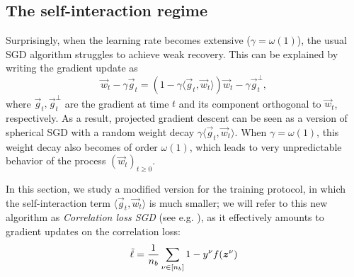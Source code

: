 \subsection{The self-interaction regime}
Surprisingly, when the learning rate becomes extensive ($\gamma = \omega(1)$), the usual SGD algorithm struggles to achieve weak recovery. This can be explained by writing the gradient update as
\[ \vec{w}_t - \gamma \vec{g}_t = (1 - \gamma\langle \vec{g}_t, \vec{w}_t \rangle)\vec{w}_t - \gamma\vec{g}_t^\bot, \]
where $\vec{g}_t, \vec{g}_t^\bot$ are the gradient at time $t$ and its component orthogonal to $\vec{w}_t$, respectively. As a result, projected gradient descent can be seen as a version of spherical SGD with a random weight decay $\gamma \langle \vec{g}_t, \vec{w}_t \rangle$. When $\gamma = \omega(1)$, this weight decay also becomes of order $\omega(1)$, which leads to very unpredictable behavior of the process $(\vec{w}_t)_{t \geq 0}$.

 In this section, we study a modified version for the training protocol, in which the self-interaction term $\langle \vec{g}_t, \vec{w}_t \rangle$ is much smaller; we will refer to this new algorithm as \emph{Correlation loss SGD} (see e.g. \cite{damian2023smoothing}), as it effectively amounts to gradient updates on the correlation loss:
\begin{align} \label{2406:eq:main:correlation_loss}
\Tilde{\ell} = \frac{1}{n_b}\sum_{\nu \in [n_b]} 1-y^{\nu}f(\vec z^{\nu})
\end{align}

